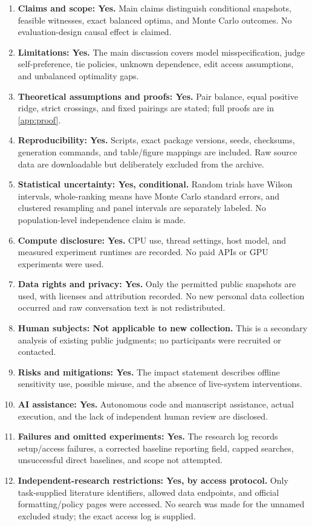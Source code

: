 \documentclass{article}
\begin{document}
\begin{enumerate}
\item \textbf{Claims and scope: Yes.} Main claims distinguish conditional snapshots, feasible witnesses, exact balanced optima, and Monte Carlo outcomes. No evaluation-design causal effect is claimed.
\item \textbf{Limitations: Yes.} The main discussion covers model misspecification, judge self-preference, tie policies, unknown dependence, edit access assumptions, and unbalanced optimality gaps.
\item \textbf{Theoretical assumptions and proofs: Yes.} Pair balance, equal positive ridge, strict crossings, and fixed pairings are stated; full proofs are in \cref{app:proof}.
\item \textbf{Reproducibility: Yes.} Scripts, exact package versions, seeds, checksums, generation commands, and table/figure mappings are included. Raw source data are downloadable but deliberately excluded from the archive.
\item \textbf{Statistical uncertainty: Yes, conditional.} Random trials have Wilson intervals, whole-ranking means have Monte Carlo standard errors, and clustered resampling and panel intervals are separately labeled. No population-level independence claim is made.
\item \textbf{Compute disclosure: Yes.} CPU use, thread settings, host model, and measured experiment runtimes are recorded. No paid APIs or GPU experiments were used.
\item \textbf{Data rights and privacy: Yes.} Only the permitted public snapshots are used, with licenses and attribution recorded. No new personal data collection occurred and raw conversation text is not redistributed.
\item \textbf{Human subjects: Not applicable to new collection.} This is a secondary analysis of existing public judgments; no participants were recruited or contacted.
\item \textbf{Risks and mitigations: Yes.} The impact statement describes offline sensitivity use, possible misuse, and the absence of live-system interventions.
\item \textbf{AI assistance: Yes.} Autonomous code and manuscript assistance, actual execution, and the lack of independent human review are disclosed.
\item \textbf{Failures and omitted experiments: Yes.} The research log records setup/access failures, a corrected baseline reporting field, capped searches, unsuccessful direct baselines, and scope not attempted.
\item \textbf{Independent-research restrictions: Yes, by access protocol.} Only task-supplied literature identifiers, allowed data endpoints, and official formatting/policy pages were accessed. No search was made for the unnamed excluded study; the exact access log is supplied.
\end{enumerate}
\end{document}
